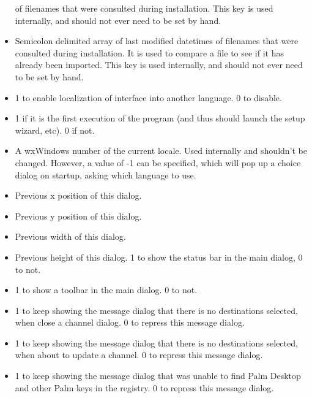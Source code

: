 \begin{helponly}
\begin{itemize}
    of filenames that were consulted during installation. This key is used
    internally, and should not ever need to be set by hand.
  \item {} Semicolon delimited array
    of last modified datetimes of filenames that were consulted during installation.
    It is used to compare a file to see if it has already been imported.
    This key is used internally, and should not ever need to be set by hand.
  \item {} 1 to enable localization of
    interface into another language. 0 to disable.
  \item {} 1 if it is the first execution of the 
    program (and thus should launch the setup wizard, etc). 0 if not.
  \item {} A wxWindows number of the current locale. 
    Used internally and shouldn't be changed. However, a value of -1 can be
    specified, which will pop up a choice dialog on startup, asking which 
    language to use.
  \item {} Previous x position of this dialog.
  \item {} Previous y position of this dialog.
  \item {} Previous width of this dialog.
  \item {} Previous height of this dialog.
     1 to show the status bar in the main dialog, 
    0 to not.
  \item {} 1 to show a toolbar in the main dialog.
    0 to not.  
  \item {} 1 to keep
    showing the message dialog that there is no destinations selected, when
    close a channel dialog. 0 to repress this message dialog.
  \item {} 1 to keep
    showing the message dialog that there is no destinations selected, when
    about to update a channel. 0 to repress this message dialog.
  \item {} 1 to keep
    showing the message dialog that was unable to find Palm Desktop and
    other Palm keys in the registry. 0 to repress this message dialog.

\end{itemize}
\end{helponly}
